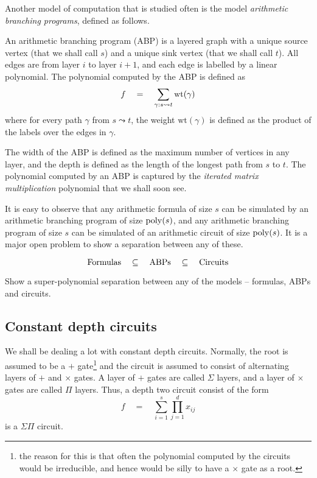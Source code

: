 Another model of computation that is studied often is the model \emph{arithmetic branching programs}, defined as follows. 

\begin{definition}\label{defn:ABP}
An arithmetic branching program (ABP) is a layered graph with a unique source vertex (that we shall call $s$) and a unique sink vertex (that we shall call $t$). All edges are from layer $i$ to layer $i+1$, and each edge is labelled by a linear polynomial. The polynomial computed by the ABP is defined as 
\[
f\quad = \quad \sum_{\gamma: s \leadsto t} \mathrm{wt}(\gamma)
\]
where for every path $\gamma$ from $s\leadsto t$, the weight $\mathrm{wt}(\gamma)$ is defined as the product of the labels over the edges in $\gamma$. 
\end{definition}

The width of the ABP is defined as the maximum number of vertices in any layer, and the depth is defined as the length of the longest path from $s$ to $t$. The polynomial computed by an ABP is captured by the \emph{iterated matrix multiplication} polynomial that we shall soon see. 

It is easy to observe that any arithmetic formula of size $s$ can be simulated by an arithmetic branching program of size $\mathrm{poly}(s)$, and any arithmetic branching program of size $s$ can be simulated of an arithmetic circuit of size $\mathrm{poly}(s)$. It is a major open problem to show a separation between any of these. 

\[
\mathrm{Formulas} \quad \subseteq \quad \mathrm{ABPs} \quad \subseteq \quad \mathrm{Circuits}
\]

\begin{openproblem}
Show a super-polynomial separation between any of the models -- formulas, ABPs and circuits. 
\end{openproblem}

\subsection{Constant depth circuits}

We shall be dealing a lot with constant depth circuits. Normally, the root is assumed to be a $+$ gate\footnote{the reason for this is that often the polynomial computed by the circuits would be irreducible, and hence would be silly to have a $\times$ gate as a root.} and the circuit is assumed to consist of alternating layers of $+$ and $\times$ gates. A layer of $+$ gates are called $\Sigma$ layers, and a layer of $\times$ gates are called $\Pi$ layers. Thus, a depth two circuit consist of the form 
\[
f\quad = \quad \sum_{i=1}^s \prod_{j=1}^d x_{ij}
\]
is a $\Sigma\Pi$ circuit. 

